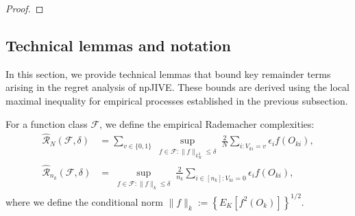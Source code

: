 \documentclass[11pt]{article}
\theoremstyle{plain}
\theoremstyle{definition}
\theoremstyle{remark}
\theoremstyle{definition}
\begin{document}
\begin{proof}
\end{proof}

 

 


\subsection{Technical lemmas and notation}


In this section, we provide technical lemmas that bound key remainder terms arising in the regret analysis of npJIVE. These bounds are derived using the local maximal inequality for empirical processes established in the previous subsection.  


For a function class $\mathcal{F}$, we define the empirical Rademacher complexities:
\begin{align*}
    \widehat{\mathcal{R}}_N(\mathcal{F}, \delta) &= \sum_{v \in \{0,1\}}\sup_{\substack{f \in \mathcal{F} : \| f \|_{L^2_K} \leq \delta}} \frac{2}{N} \sum_{i: V_{ki} = v} \epsilon_i f(O_{ki}), \\
     \widehat{\mathcal{R}}_{n_k}(\mathcal{F}, \delta) &=   \sup_{\substack{f \in \mathcal{F} : \| f \|_k \leq \delta}} \frac{2}{n_k} \sum_{i  \in [n_k]: V_{ki} = 0} \epsilon_i f(O_{ki}) ,
\end{align*}
where we define the conditional norm  \(\|f\|_k := \left\{ E_K \left[ f^2(O_k) \right] \right\}^{1/2}.\) 
\end{document}
